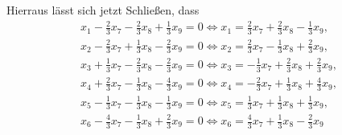 Hierraus lässt sich jetzt Schließen, dass 
\begin{align*}  
  x_1 -\frac{2}{3}x_7 - \frac{2}{3}x_8 + \frac{1}{3}x_9 = 0 \Leftrightarrow x_1 = \frac{2}{3}x_7 + \frac{2}{3}x_8 - \frac{1}{3}x_9, \\
  x_2 -\frac{2}{3}x_7 + \frac{1}{3}x_8 - \frac{2}{3}x_9 = 0 \Leftrightarrow x_2 = \frac{2}{3}x_7 - \frac{1}{3}x_8 + \frac{2}{3}x_9, \\
  x_3 + \frac{1}{3}x_7 - \frac{2}{3}x_8 - \frac{2}{3}x_9 = 0 \Leftrightarrow x_3 = - \frac{1}{3}x_7 + \frac{2}{3}x_8 + \frac{2}{3}x_9, \\
  x_4 + \frac{2}{3}x_7 - \frac{1}{3}x_8 - \frac{4}{3}x_9 = 0 \Leftrightarrow x_4 = - \frac{2}{3}x_7 + \frac{1}{3}x_8 + \frac{4}{3}x_9, \\
  x_5 -\frac{1}{3}x_7 - \frac{1}{3}x_8 - \frac{1}{3}x_9 = 0 \Leftrightarrow x_5 = \frac{1}{3}x_7 + \frac{1}{3}x_8 + \frac{1}{3}x_9, \\
  x_6 - \frac{4}{3}x_7 - \frac{1}{3}x_8 + \frac{2}{3}x_9 = 0 \Leftrightarrow x_6 = \frac{4}{3}x_7 + \frac{1}{3}x_8 - \frac{2}{3}x_9
\end{align*}

